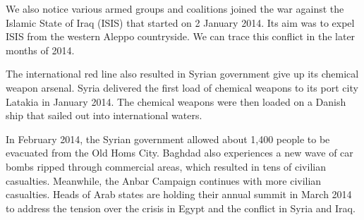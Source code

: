 We also notice various armed groups and coalitions joined the war against the Islamic State of Iraq (ISIS) that started on 2 January 2014. Its aim was to expel ISIS from the western Aleppo countryside. We can trace this conflict in the later months of 2014.

The international red line also resulted in Syrian government give up its chemical weapon arsenal. Syria delivered the first load of chemical weapons to its port city Latakia in January 2014. The chemical weapons were then loaded on a Danish ship that sailed out into international waters. 

In February 2014, the Syrian government allowed about 1,400 people to be evacuated from the Old Homs City. Baghdad also experiences a new wave of car bombs ripped through commercial areas, which resulted in tens of civilian casualties. Meanwhile, the Anbar Campaign continues with more civilian casualties.
Heads of Arab states are holding their annual summit in March 2014 to address the tension over the crisis in Egypt and the conflict in Syria and Iraq.



